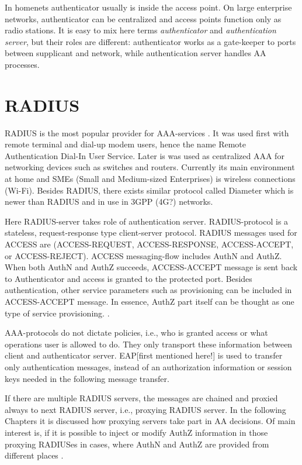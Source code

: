 \documentclass[12pt,a4paper,english]{tutthesis}
\begin{document}
In homenets authenticator usually is inside the access point.
On large enterprise networks, authenticator can be centralized 
and access points function only as radio stations.
It is easy to mix here terms \emph{authenticator} and \emph{authentication
server}, but their roles are different: authenticator works as a
gate-keeper to ports between supplicant and network, while
authentication server handles AA processes.

\section{RADIUS}
\label{sec-2-2}
\label{sec:radius}
RADIUS is the most popular provider for
AAA-services \cite[p.75]{radius-popular}.  It was used first with remote terminal and dial-up modem users, hence the name Remote
Authentication Dial-In User Service. Later is was used as centralized AAA
for networking devices such as switches and routers.  Currently its
main environment at home and SMEs (Small and Medium-sized Enterprises) is
wireless connections (Wi-Fi).  Besides RADIUS, there exists similar protocol
called Diameter which is newer than RADIUS and in use in 3GPP (4G?)
networks. 

Here RADIUS-server takes role of authentication server.
RADIUS-protocol is a stateless, request-response type client-server
protocol.  RADIUS messages used for ACCESS are (ACCESS-REQUEST,
ACCESS-RESPONSE, ACCESS-ACCEPT, or ACCESS-REJECT). ACCESS
messaging-flow includes AuthN and AuthZ. When both AuthN and AuthZ
succeeds, ACCESS-ACCEPT message is sent back to Authenticator and
access is granted to the protected port.  Besides authentication, other
service parameters such as provisioning can be included in
ACCESS-ACCEPT message. In essence, AuthZ part itself can be thought as
one type of service provisioning. \cite{rfc5608}.



AAA-protocols do not dictate policies, i.e., who is granted access or
what operations user is allowed to do. They only transport these information
between client and authenticator server.
EAP[first mentioned here!] is used to transfer only authentication
messages, instead of an authorization information or session keys needed
in the following message transfer. 

If there are multiple RADIUS servers, the messages are chained and
proxied always to next RADIUS server, i.e.,   proxying RADIUS server.
In the following Chapters it is discussed how proxying servers take 
part in AA decisions. Of main interest is, if it is possible 
to inject or modify AuthZ information in those proxying RADIUSes in cases, 
where AuthN and AuthZ are provided from different
places \cite{rfc2607}.
\end{document}
